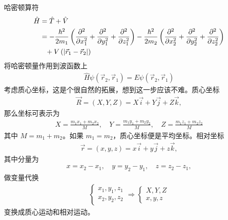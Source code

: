哈密顿算符
\begin{align}
    \hat H &= \hat T + \hat V \\
    &= -\frac{\hbar^2}{2m_1} \left(
        \pdv[2]{x_1} + \pdv[2]{y_1} + \pdv[2]{z_1}
    \right) 
    - \frac{\hbar^2}{2m_2} \left(
        \pdv[2]{x_2} + \pdv[2]{y_2} + \pdv[2]{z_2}
    \right) \notag\\
    &\phantom{=} + V\left(
        |\vec r_1 - \vec r_2|
        \right)
\end{align}
将哈密顿量作用到波函数上
\begin{align}
    \hat H \psi(\vec r_2, \vec r_1) = E \psi (\vec r_2, \vec r_1)
\end{align}
考虑质心坐标，这是个很自然的拓展，想到这一步应该不难。质心坐标
\begin{align}
    \vec R = (X,Y,Z) = X \vec i + Y \vec j + Z \vec k,
\end{align}
那么坐标可表示为
\begin{align}
    X = \frac{m_1 x_1 + m_2 x_2}{M}, \quad Y = \frac{m_1 y_1 + m_2 y_2}{M}, \quad
    Z = \frac{m_1 z_1 + m_2 z_2}{M}
\end{align}
其中 $M = m_1 + m_2$。如果 $m_1 = m_2$，质心坐标便是平均坐标。相对坐标
\begin{align}
    \vec r = (x,y,z) = x \vec i + y \vec j + z \vec k,
\end{align}
其中分量为
\begin{align}
    x = x_2 - x_1, \quad y = y_2 - y_1, \quad z= z_2-z_1,
\end{align}
做变量代换
\begin{align}
    \begin{cases}
        x_1, y_1, z_1\\
        x_2, y_2, z_2
    \end{cases}
    \Rightarrow 
    \begin{cases}
        X,Y,Z\\
        x,y,z
    \end{cases}
\end{align}
变换成质心运动和相对运动。

